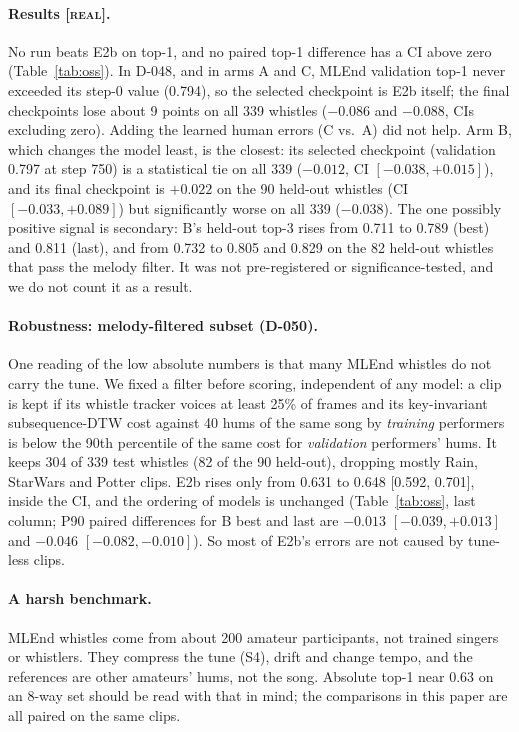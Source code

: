 \documentclass[11pt]{article}
\newcommand{\real}{\textsc{[real]}}
\begin{document}
\paragraph{Results \real.} No run beats E2b on top-1, and no paired top-1 difference has a CI above zero (Table~\ref{tab:oss}). In D-048, and in arms A and C, MLEnd validation top-1 never exceeded its step-0 value (0.794), so the selected checkpoint is E2b itself; the final checkpoints lose about 9 points on all 339 whistles ($-0.086$ and $-0.088$, CIs excluding zero). Adding the learned human errors (C vs.\ A) did not help. Arm B, which changes the model least, is the closest: its selected checkpoint (validation 0.797 at step 750) is a statistical tie on all 339 ($-0.012$, CI $[-0.038, +0.015]$), and its final checkpoint is $+0.022$ on the 90 held-out whistles (CI $[-0.033, +0.089]$) but significantly worse on all 339 ($-0.038$). The one possibly positive signal is secondary: B's held-out top-3 rises from 0.711 to 0.789 (best) and 0.811 (last), and from 0.732 to 0.805 and 0.829 on the 82 held-out whistles that pass the melody filter. It was not pre-registered or significance-tested, and we do not count it as a result.

\paragraph{Robustness: melody-filtered subset (D-050).} One reading of the low absolute numbers is that many MLEnd whistles do not carry the tune. We fixed a filter before scoring, independent of any model: a clip is kept if its whistle tracker voices at least 25\% of frames and its key-invariant subsequence-DTW cost against 40 hums of the same song by \emph{training} performers is below the 90th percentile of the same cost for \emph{validation} performers' hums. It keeps 304 of 339 test whistles (82 of the 90 held-out), dropping mostly Rain, StarWars and Potter clips. E2b rises only from 0.631 to 0.648 [0.592, 0.701], inside the CI, and the ordering of models is unchanged (Table~\ref{tab:oss}, last column; P90 paired differences for B best and last are $-0.013$ $[-0.039, +0.013]$ and $-0.046$ $[-0.082, -0.010]$). So most of E2b's errors are not caused by tune-less clips.

\paragraph{A harsh benchmark.} MLEnd whistles come from about 200 amateur participants, not trained singers or whistlers. They compress the tune (S4), drift and change tempo, and the references are other amateurs' hums, not the song. Absolute top-1 near 0.63 on an 8-way set should be read with that in mind; the comparisons in this paper are all paired on the same clips.
\end{document}

